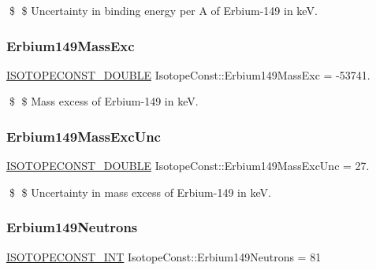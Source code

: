 \$ \$ Uncertainty in binding energy per A of Erbium-\/149 in keV. \mbox{\label{group___isotope_const-_erbium-_er149_ga61b0aea21a70977a3318f86268d203de}} 
\subsubsection{\texorpdfstring{Erbium149\+Mass\+Exc}{Erbium149MassExc}}
{\footnotesize\ttfamily \mbox{\hyperlink{group___isotope_const-_macros_ga8f45a7272ce02c0b4c65c44636ed719a}{I\+S\+O\+T\+O\+P\+E\+C\+O\+N\+S\+T\+\_\+\+D\+O\+U\+B\+LE}} Isotope\+Const\+::\+Erbium149\+Mass\+Exc = -\/53741.}

\$ \$ Mass excess of Erbium-\/149 in keV. \mbox{\label{group___isotope_const-_erbium-_er149_ga0b3ed45f9432223882f837024d5d37d3}} 
\subsubsection{\texorpdfstring{Erbium149\+Mass\+Exc\+Unc}{Erbium149MassExcUnc}}
{\footnotesize\ttfamily \mbox{\hyperlink{group___isotope_const-_macros_ga8f45a7272ce02c0b4c65c44636ed719a}{I\+S\+O\+T\+O\+P\+E\+C\+O\+N\+S\+T\+\_\+\+D\+O\+U\+B\+LE}} Isotope\+Const\+::\+Erbium149\+Mass\+Exc\+Unc = 27.}

\$ \$ Uncertainty in mass excess of Erbium-\/149 in keV. \mbox{\label{group___isotope_const-_erbium-_er149_ga78586c841a41f5e26b693b6ca8a90666}} 
\subsubsection{\texorpdfstring{Erbium149\+Neutrons}{Erbium149Neutrons}}
{\footnotesize\ttfamily \mbox{\hyperlink{group___isotope_const-_macros_ga5f18360b3e99483a35c32d789e62621c}{I\+S\+O\+T\+O\+P\+E\+C\+O\+N\+S\+T\+\_\+\+I\+NT}} Isotope\+Const\+::\+Erbium149\+Neutrons = 81}

